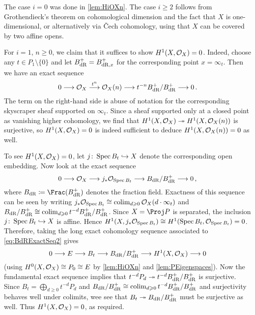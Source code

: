 \begin{proof*}
	The case $i=0$ was done in \cref{lem:HiOXn}. The case $i\geq 2$ follows from Grothendieck's theorem on cohomological dimension and the fact that $X$ is one-dimensional, or alternatively via \v Cech cohomology, using that $X$ can be covered by two affine opens.
	
	For $i=1$, $n\geq 0$, we claim that it suffices to show $H^1(X,\mathcal{O}_X)=0$. Indeed, choose any $t\in P_1\setminus\{0\}$ and let $B_{\mathrm{dR}}^+=B_{\mathrm{dR},x}^+$ for the corresponding point $x=\infty_t$. Then we have an exact sequence
	\begin{equation}\label{eq:BdRExactSeq1}
		0\morphism \Oo_X\morphism[t^n]\Oo_X(n)\morphism t^{-n}B_{\dR}^+/B_{\dR}^+\morphism 0\,.
	\end{equation}
	The term on the right-hand side is abuse of notation for the corresponding skyscraper sheaf supported on $\infty_t$. Since a sheaf supported only at a closed point as vanishing higher cohomology, we find that $H^1(X,\Oo_X)\epimorphism H^1(X,\Oo_X(n))$ is surjective, so $H^1(X,\mathcal{O}_X)=0$ is indeed sufficient to deduce $H^1(X,\mathcal{O}_X(n))=0$ as well.
	
	To see $H^1(X,\mathcal{O}_X)=0$, let $j\colon \Spec B_t\monomorphism X$ denote the corresponding open embedding. Now look at the exact sequence
	\begin{equation}\label{eq:BdRExactSeq2}
		0\morphism \Oo_X\morphism j_*\Oo_{\Spec B_t}\morphism B_{\dR}/B^+_\dR\morphism 0\,,
	\end{equation} 
	where $B_\dR\coloneqq \Frac(B^+_\dR)$ denotes the fraction field. Exactness of this sequence can be seen by writing $j_*\mathcal{O}_{\operatorname{Spec} B_t}\cong \operatorname*{colim}_{d\geqslant 0}\mathcal{O}_X(d\cdot \infty_t)$ and $B_{\mathrm{dR}}/B_{\mathrm{dR}}^+\cong \operatorname*{colim}_{d\geqslant 0}t^{-d}B_{\mathrm{dR}}^+/B_{\mathrm{dR}}^+$. Since $X=\Proj P$ is separated, the inclusion $j\colon \Spec B_t\monomorphism X$ is affine. Hence $H^1(X,j_*\mathcal{O}_{\operatorname{Spec} B_t})\cong H^1(\operatorname{Spec} B_t,\mathcal{O}_{\operatorname{Spec} B_t})=0$. Therefore, taking the long exact cohomology sequence associated to \cref{eq:BdRExactSeq2} gives
	\begin{equation*}
		0\morphism E\morphism B_t\morphism B_\dR/B_\dR^+\morphism H^1(X,\Oo_X)\morphism 0
	\end{equation*}
	(using $H^0(X,\mathcal{O}_X)\cong P_0\cong E$ by \cref{lem:HiOXn} and \cref{lem:PEigenspaces}). Now the fundamental exact sequence implies that $t^{-d}P_d\epimorphism t^{-d}B_\dR^+/B_\dR^+$ is surjective. Since $B_t=\bigoplus_{d\geq 0}t^{-d}P_d$ and $B_{\mathrm{dR}}/B_{\mathrm{dR}}^+\cong \operatorname*{colim}_{d\geqslant 0}t^{-d}B_{\mathrm{dR}}^+/B_{\mathrm{dR}}^+$ and surjectivity behaves well under colimits, wee see that $B_t\epimorphism B_\dR/B_\dR^+$ must be surjective as well. Thus $H^1(X,\mathcal{O}_X)=0$, as required.
	

\end{proof*}

